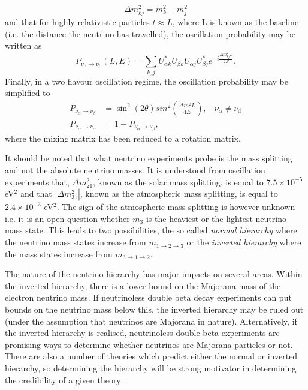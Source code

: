 \begin{equation}
    \Delta m^2_{kj} = m_k^2 - m_j^2
\end{equation}
and that for highly relativistic particles $t \approx L$, where L is known as the baseline (i.e. the distance the neutrino has travelled), the oscillation probability may be written as 
\begin{equation}
     P_{\nu_\alpha \rightarrow \nu_\beta}(L,E) = \sum_{k,j} U^*_{\alpha k} U_{\beta k} U_{\alpha j} U^*_{\beta j} e^{-i\frac{\Delta m^2_{kj}L}{2E}}.
\end{equation}
Finally, in a two flavour oscillation regime, the oscillation probability may be simplified to
\begin{equation}
\begin{split}
    P_{\nu_\alpha \rightarrow \nu_\beta} &= \sin^2(2\theta)sin^2(\frac{\Delta m^2L}{4E}), \ \ \ \ \nu_\alpha \neq \nu_\beta   \\
    P_{\nu_\alpha \rightarrow \nu_\alpha} &= 1 - P_{\nu_\alpha \rightarrow \nu_\beta},
\end{split}
\end{equation}
where the mixing matrix has been reduced to a rotation matrix. 

It should be noted that what neutrino experiments probe is the mass splitting and not the absolute neutrino masses. It is understood from oscillation experiments that, $\Delta m_{21}^2$, known as the solar mass splitting, is equal to $7.5 \times 10^{-5}$ eV$^2$ and that $|\Delta m_{31}^2|$, known as the atmospheric mass splitting, is equal to $2.4 \times 10^{-3}$ eV$^2$. The sign of the atmospheric mass splitting is however unknown i.e. it is an open question whether $m_3$ is the heaviest or the lightest neutrino mass state. This leads to two possibilities, the so called \textit{normal hierarchy} where the neutrino mass states increase from $m_{1 \rightarrow 2 \rightarrow 3}$ or the \textit{inverted hierarchy} where the mass states increase from $m_{3 \rightarrow 1 \rightarrow 2}$. 

The nature of the neutrino hierarchy has major impacts on several areas. Within the inverted hierarchy, there is a lower bound on the Majorana mass of the electron neutrino mass. If neutrinoless double beta decay experiments can put bounds on the neutrino mass below this, the inverted hierarchy may be ruled out (under the assumption that neutrinos are Majorana in nature). Alternatively, if the inverted hierarchy is realised, neutrinoless double beta experiments are promising ways to determine whether neutrinos are Majorana particles or not. There are also a number of theories which predict either the normal or inverted hierarchy, so determining the hierarchy will be strong motivator in determining the credibility of a given theory \cite{mass_hierarchy}.

